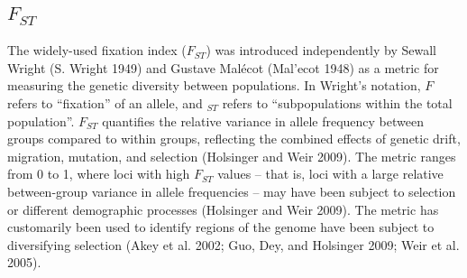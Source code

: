 \documentclass[
]{book}
\begin{document}
\hypertarget{Fst-descr}{%
\subsection{\texorpdfstring{\(F_{ST}\)}{F\_\{ST\}}}\label{Fst-descr}}

The widely-used fixation index (\(F_{ST}\)) was introduced independently by Sewall Wright (S. Wright 1949) and Gustave Malécot (Mal'ecot 1948) as a metric for measuring the genetic diversity between populations. In Wright's notation, \(F\) refers to ``fixation'' of an allele, and \(_{ST}\) refers to ``subpopulations within the total population''. \(F_{ST}\) quantifies the relative variance in allele frequency between groups compared to within groups, reflecting the combined effects of genetic drift, migration, mutation, and selection (Holsinger and Weir 2009). The metric ranges from 0 to 1, where loci with high \(F_{ST}\) values -- that is, loci with a large relative between-group variance in allele frequencies -- may have been subject to selection or different demographic processes (Holsinger and Weir 2009). The metric has customarily been used to identify regions of the genome have been subject to diversifying selection (Akey et al. 2002; Guo, Dey, and Holsinger 2009; Weir et al. 2005).
\end{document}
